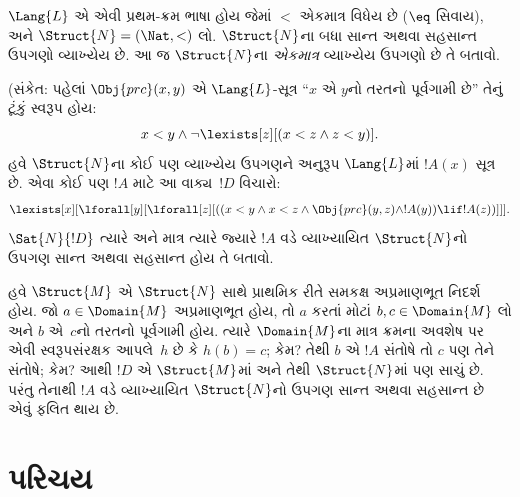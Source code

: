 \begin{prob}
$\Lang{L}$ એ એવી પ્રથમ-ક્રમ ભાષા
હોય જેમાં $<$ એકમાત્ર વિધેય
છે ($\eq$ સિવાય), અને
$\Struct{N} = (\Nat,
<)$ લો. $\Struct{N}$ના બધા
સાન્ત અથવા સહસાન્ત ઉપગણો
વ્યાખ્યેય છે. આ જ
$\Struct{N}$ના \emph{એકમાત્ર}
વ્યાખ્યેય ઉપગણો છે તે
બતાવો.

(સંકેત: પહેલાં
$\Obj{prc}(x,y)$ એ
$\Lang{L}$-સૂત્ર
“$x$ એ $y$નો
તરતનો પૂર્વગામી છે”
તેનું ટૂંકું સ્વરૂપ
હોય:
\[
x<y \land \lnot \lexists[z][(x<z \land z < y)].
\]
હવે $\Struct{N}$ના
કોઈ પણ વ્યાખ્યેય
ઉપગણને અનુરૂપ
$\Lang{L}$માં
$!A(x)$ સૂત્ર છે.
એવા કોઈ પણ
$!A$ માટે
આ વાક્ય~$!D$
વિચારો:
\[
\lexists[x][\lforall[y][\lforall[z][((x<y \land x<z \land \Obj{prc}(y,z)
  \land !A(y)) \lif !A(z))]]].
\]
$\Sat{N}{!D}$ ત્યારે
અને માત્ર ત્યારે
જ્યારે $!A$ વડે
વ્યાખ્યાયિત
$\Struct{N}$નો
ઉપગણ સાન્ત
અથવા સહસાન્ત
હોય તે બતાવો.

હવે $\Struct{M}$
એ $\Struct{N}$
સાથે પ્રાથમિક
રીતે સમકક્ષ
અપ્રમાણભૂત
નિદર્શ હોય.
જો $a \in
\Domain{M}$
અપ્રમાણભૂત હોય,
તો $a$ કરતાં
મોટાં $b, c \in
\Domain{M}$ લો
અને $b$ એ~$c$નો
તરતનો પૂર્વગામી
હોય. ત્યારે
$\Domain{M}$ના
માત્ર ક્રમના
અવશેષ પર એવી
સ્વરૂપસંરક્ષક
આપલે~$h$ છે
કે $h(b)=c$;
કેમ? તેથી
$b$ એ $!A$
સંતોષે તો
$c$ પણ તેને
સંતોષે; કેમ?
આથી $!D$
એ $\Struct{M}$માં
અને તેથી
$\Struct{N}$માં
પણ સાચું છે.
પરંતુ તેનાથી
$!A$ વડે
વ્યાખ્યાયિત
$\Struct{N}$નો
ઉપગણ સાન્ત
અથવા સહસાન્ત
છે એવું ફલિત
થાય છે.

\end{prob}
\endgroup
\endgroup


\begingroup
\makeatletter{}\makeatother

\label{guunit:OLP-0191}


\begingroup
\makeatletter{}\makeatother

\section{પરિચય}
\label{guunit:OLP-0192}


